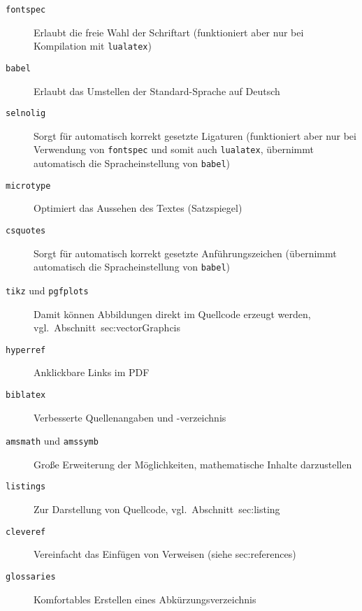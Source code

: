 \begin{description}
  \item[\texttt{fontspec}] Erlaubt die freie Wahl der Schriftart (funktioniert aber nur bei Kompilation mit \texttt{lualatex})
 \item[\texttt{babel}] Erlaubt das Umstellen der Standard-Sprache auf Deutsch
 \item[\texttt{selnolig}] Sorgt für automatisch korrekt gesetzte Ligaturen (funktioniert aber nur bei Verwendung von \texttt{fontspec} und somit auch
 \texttt{lualatex}, übernimmt automatisch die Spracheinstellung von \texttt{babel})
 \item[\texttt{microtype}] Optimiert das Aussehen des Textes (Satzspiegel)
 \item[\texttt{csquotes}] Sorgt für automatisch korrekt gesetzte Anführungszeichen (übernimmt automatisch die Spracheinstellung von \texttt{babel})
 \item[\texttt{tikz} und \texttt{pgfplots}] Damit können Abbildungen direkt im Quellcode erzeugt werden, vgl.\ Abschnitt~sec:vectorGraphcis
 \item[\texttt{hyperref}] Anklickbare Links im PDF
 \item[\texttt{biblatex}] Verbesserte Quellenangaben und -verzeichnis
 \item[\texttt{amsmath} und \texttt{amssymb}] Große Erweiterung der Möglichkeiten, mathematische Inhalte darzustellen
 \item[\texttt{listings}] Zur Darstellung von Quellcode, vgl.\ Abschnitt~sec:listing
 \item[\texttt{cleveref}] Vereinfacht das Einfügen von Verweisen (siehe sec:references)
 \item[\texttt{glossaries}] Komfortables Erstellen eines Abkürzungsverzeichnis
\end{description}
